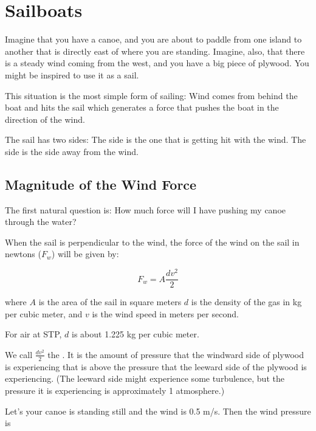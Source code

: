 \chapter{Sailboats}

Imagine that you have a canoe, and you are about to paddle from one island to another that is directly east of where you are standing.  Imagine, also, that there 
is a steady wind coming from the west, and you have a big piece of plywood.  You might be inspired to use it as a sail.

This situation is the most simple form of sailing: Wind comes from behind the boat and hits the sail which generates a force that pushes the 
boat in the direction of the wind.

The sail has two sides:  The  side is the one that is getting hit with the wind.  The  side is the side away from the wind.

\section{Magnitude of the Wind Force}

The first natural question is: How much force will I have pushing my canoe through the water?

\begin{mdframed}[style=important, frametitle={Wind Force}]

When the sail is perpendicular to the wind,  the force of the wind on the sail in newtons ($F_w$) will be given by:

$$F_w = A \frac{d v^2}{2}$$

where $A$ is the area of the sail in square meters  $d$ is the density of the gas in kg per cubic meter, and $v$ is the wind speed in meters per second.

For air at STP,  $d$ is about 1.225 kg per cubic meter.

We call $\frac{d v^2}{2}$  the .   It is the amount of pressure that the windward side of plywood is experiencing that is above the 
 pressure that the leeward side of the plywood is experiencing.  (The leeward side might experience some turbulence,  but the pressure it is experiencing is 
 approximately 1 atmosphere.)

\end{mdframed}

Let's your canoe is standing still and the wind is 0.5 m/s.  Then the wind pressure is

